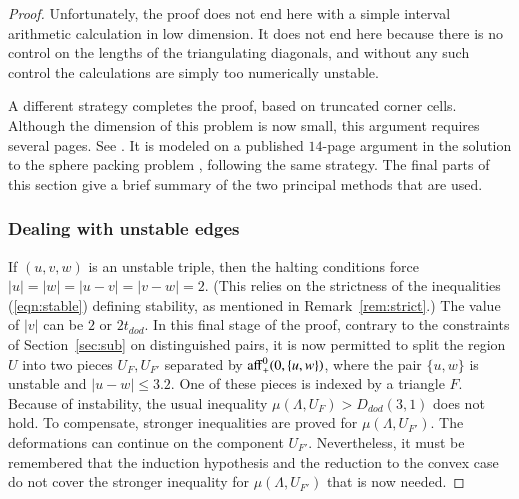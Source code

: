 \documentclass{article} %
\begin{document}
\begin{proof}
Unfortunately, the proof does not end here with a simple interval
arithmetic calculation in low dimension.  It does not end
here because there is no control on the
lengths of the triangulating diagonals, and without any such
control the calculations are simply too numerically unstable.


A different strategy completes the proof, based on truncated
corner cells.  Although the dimension of this problem is now small,
this argument requires several pages.
See \cite[pp.30-38]{Hales:2002:Dodec}.  It is modeled on a published
$14$-page argument in the solution to the sphere packing problem
\cite[\S\S13.2-13.11]{Hales:2006:DCG}, following the same strategy.
The final parts of this section give a brief summary of the two principal  methods that are used.

\subsubsection{Dealing with unstable edges}
If $(u,v,w)$ is an unstable triple, then the
halting conditions force $|u|=|w|=|u-v|=|v-w|=2$.  (This
relies on the strictness of the inequalities (\ref{eqn:stable})
defining stability,
as mentioned in Remark~\ref{rem:strict}.)
The value of $|v|$ can be $2$ or $2t_{dod}$. In this final
stage of the proof, contrary to the constraints of Section~\ref{sec:sub}
on distinguished pairs,
it is now permitted to split the region $U$ into two pieces
$U_F,U_{F'}$ separated by ${\operatorname{aff}}_+^0(0,\{u,w\})$, where
the pair $\{u,w\}$ is unstable and $|u-w|\le 3.2$.  
One of these pieces is indexed
by a triangle $F$.  Because of instability, the usual inequality
$\mu(\Lambda,U_F)> D_{dod}(3,1)$ does not hold.  To compensate,
stronger inequalities are proved for $\mu(\Lambda,U_{F'})$.
The deformations can continue on the component $U_{F'}$. Nevertheless,
it must be remembered that the induction hypothesis and the 
reduction to the convex case do not cover the stronger 
inequality for $\mu(\Lambda,U_{F'})$ that is now needed.


\end{proof}
\end{document}
